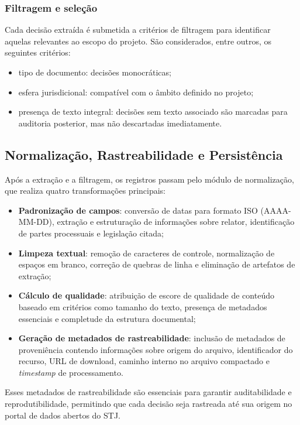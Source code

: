 \subsubsection{Filtragem e seleção}
Cada decisão extraída é submetida a critérios de filtragem para identificar aquelas relevantes ao escopo do projeto. São considerados, entre outros, os seguintes critérios:
\begin{itemize}
  \item tipo de documento: decisões monocráticas;
  \item esfera jurisdicional: compatível com o âmbito definido no projeto;
  \item presença de texto integral: decisões sem texto associado são marcadas para auditoria posterior, mas não descartadas imediatamente.
\end{itemize}

\subsection{Normalização, Rastreabilidade e Persistência}
Após a extração e a filtragem, os registros passam pelo módulo de normalização, que realiza quatro transformações principais:

\begin{itemize}
  \item \textbf{Padronização de campos}: conversão de datas para formato ISO (AAAA-MM-DD), extração e estruturação de informações sobre relator, identificação de partes processuais e legislação citada;
  \item \textbf{Limpeza textual}: remoção de caracteres de controle, normalização de espaços em branco, correção de quebras de linha e eliminação de artefatos de extração;
  \item \textbf{Cálculo de qualidade}: atribuição de escore de qualidade de conteúdo baseado em critérios como tamanho do texto, presença de metadados essenciais e completude da estrutura documental;
  \item \textbf{Geração de metadados de rastreabilidade}: inclusão de metadados de proveniência contendo informações sobre origem do arquivo, identificador do recurso, URL de download, caminho interno no arquivo compactado e \textit{timestamp} de processamento.
\end{itemize}

Esses metadados de rastreabilidade são essenciais para garantir auditabilidade e reprodutibilidade, permitindo que cada decisão seja rastreada até sua origem no portal de dados abertos do STJ.

